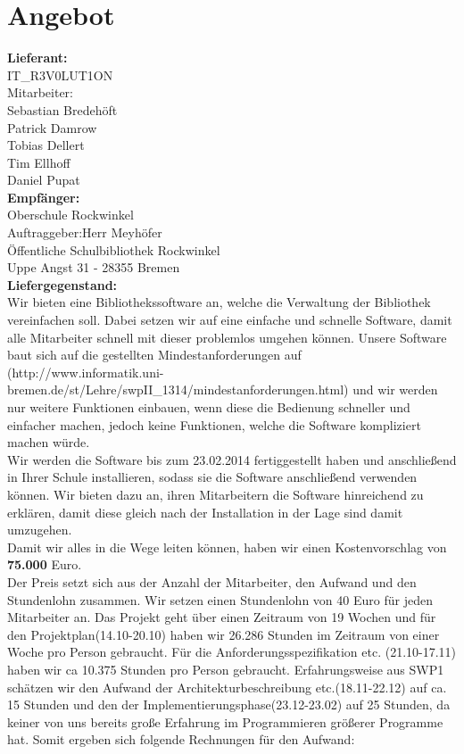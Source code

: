 \documentclass[fontsize=12pt,paper=a4,twoside]{scrartcl}
\begin{document}
\section*{Angebot}
\textbf{Lieferant:}\\
IT\_R3V0LUT1ON\\
Mitarbeiter:\\
Sebastian Bredehöft\\
Patrick Damrow\\
Tobias Dellert\\
Tim Ellhoff\\
Daniel Pupat\\
\textbf{Empfänger:}\\
Oberschule Rockwinkel\\
Auftraggeber:Herr Meyhöfer\\
Öffentliche Schulbibliothek Rockwinkel\\
Uppe Angst 31 - 28355 Bremen\\
\textbf{Liefergegenstand:}\\
Wir bieten eine Bibliothekssoftware an, welche die Verwaltung der Bibliothek vereinfachen soll. Dabei setzen wir auf eine einfache und schnelle Software, damit alle Mitarbeiter schnell mit dieser problemlos umgehen können. Unsere Software baut sich auf die gestellten Mindestanforderungen auf (http://www.informatik.uni-bremen.de/st/Lehre/swpII\_1314/mindestanforderungen.html) und wir werden nur weitere Funktionen einbauen, wenn diese die Bedienung schneller und einfacher machen, jedoch keine Funktionen, welche die Software kompliziert machen würde.\\
Wir werden die Software bis zum 23.02.2014 fertiggestellt haben und anschließend in Ihrer Schule installieren, sodass sie die Software anschließend verwenden können. Wir bieten dazu an, ihren Mitarbeitern die Software hinreichend zu erklären, damit diese gleich nach der Installation in der Lage sind damit umzugehen.\\
Damit wir alles in die Wege leiten können, haben wir einen Kostenvorschlag von \textbf{75.000} Euro.\\
Der Preis setzt sich aus der Anzahl der Mitarbeiter, den Aufwand und den Stundenlohn zusammen. Wir setzen einen Stundenlohn von 40 Euro für jeden Mitarbeiter an. Das Projekt geht über einen Zeitraum von 19 Wochen und für den Projektplan(14.10-20.10) haben wir 26.286 Stunden im Zeitraum von einer Woche pro Person gebraucht. Für die Anforderungsspezifikation etc. (21.10-17.11) haben wir ca 10.375 Stunden pro Person gebraucht. Erfahrungsweise aus SWP1 schätzen wir den Aufwand der Architekturbeschreibung etc.(18.11-22.12) auf ca. 15 Stunden und den der Implementierungsphase(23.12-23.02) auf 25 Stunden, da keiner von uns bereits große Erfahrung im Programmieren größerer Programme hat. Somit ergeben sich folgende Rechnungen für den Aufwand:\\
\end{document}

